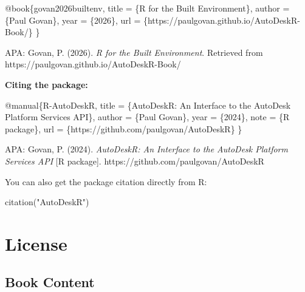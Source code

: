 \documentclass[
  11pt,
  letterpaper,
  DIV=11,
  numbers=noendperiod]{scrreprt}
\newenvironment{Shaded}{\begin{snugshade}}{\end{snugshade}}
\newcommand{\DataTypeTok}[1]{\textcolor[rgb]{0.68,0.00,0.00}{#1}}
\newcommand{\FunctionTok}[1]{\textcolor[rgb]{0.28,0.35,0.67}{#1}}
\newcommand{\NormalTok}[1]{\textcolor[rgb]{0.00,0.23,0.31}{#1}}
\newcommand{\OtherTok}[1]{\textcolor[rgb]{0.00,0.23,0.31}{#1}}
\newcommand{\StringTok}[1]{\textcolor[rgb]{0.13,0.47,0.30}{#1}}
\newcommand{\VariableTok}[1]{\textcolor[rgb]{0.07,0.07,0.07}{#1}}
\begin{document}
\begin{Shaded}
\begin{Highlighting}[]
\VariableTok{@book}\NormalTok{\{}\OtherTok{govan2026builtenv}\NormalTok{,}
  \DataTypeTok{title}\NormalTok{     = \{R for the Built Environment\},}
  \DataTypeTok{author}\NormalTok{    = \{Paul Govan\},}
  \DataTypeTok{year}\NormalTok{      = \{2026\},}
  \DataTypeTok{url}\NormalTok{       = \{https://paulgovan.github.io/AutoDeskR{-}Book/\}}
\NormalTok{\}}
\end{Highlighting}
\end{Shaded}

APA: Govan, P. (2026). \emph{R for the Built Environment}. Retrieved
from https://paulgovan.github.io/AutoDeskR-Book/

\textbf{Citing the package:}

\begin{Shaded}
\begin{Highlighting}[]
\VariableTok{@manual}\NormalTok{\{}\OtherTok{R}\NormalTok{{-}}\OtherTok{AutoDeskR}\NormalTok{,}
  \DataTypeTok{title}\NormalTok{  = \{AutoDeskR: An Interface to the AutoDesk Platform Services API\},}
  \DataTypeTok{author}\NormalTok{ = \{Paul Govan\},}
  \DataTypeTok{year}\NormalTok{   = \{2024\},}
  \DataTypeTok{note}\NormalTok{   = \{R package\},}
  \DataTypeTok{url}\NormalTok{    = \{https://github.com/paulgovan/AutoDeskR\}}
\NormalTok{\}}
\end{Highlighting}
\end{Shaded}

APA: Govan, P. (2024). \emph{AutoDeskR: An Interface to the AutoDesk
Platform Services API} {[}R package{]}.
https://github.com/paulgovan/AutoDeskR

You can also get the package citation directly from R:

\begin{Shaded}
\begin{Highlighting}[]
\FunctionTok{citation}\NormalTok{(}\StringTok{"AutoDeskR"}\NormalTok{)}
\end{Highlighting}
\end{Shaded}

\chapter*{License}\label{license}


\section*{Book Content}\label{book-content}
\end{document}
